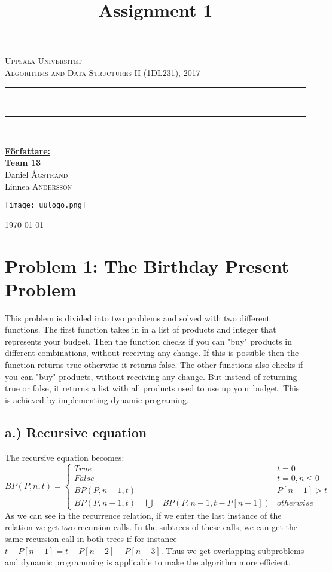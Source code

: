 \documentclass{article}
\newcommand{\HRule}{\rule{\linewidth}{0.5mm}}
\begin{document}
\begin{titlepage}
\vspace*{\fill}
\begin{center}
\textsc{\LARGE Uppsala Universitet}\\[0.3cm]
\textsc{\large Algorithms and Data Structures II (1DL231), 2017}\\[0.2cm]
\textcolor{UUred}{\HRule} \\[0.5cm]
{ \Huge \bfseries \title*{Assignment 1}}
\textcolor{UUred}{\HRule} \\[0.5cm]
\begin{flushright}
\textbf{\underline{Författare:}}\\
\textbf{Team 13}\\
Daniel \textsc{Ågstrand}\\
Linnea \textsc{Andersson}\\
\end{flushright}
\centerline{\texttt{[image: uulogo.png]}}
\textsc{{\large \today}}
\end{center}
\vspace*{\fill}
\end{titlepage}
\newpage

\section*{Problem 1: The Birthday Present Problem}
This problem is divided into two problems and solved with two different functions. The first function takes in in a list of products and integer that represents your budget. Then the function checks if you can "buy" products in different combinations, without receiving any change. If this is possible then the function returns true otherwise it returns false. The other functions also checks if you can "buy" products, without receiving any change. But instead of returning true or false, it returns a list with all products used to use up your budget. This is achieved by implementing dynamic programing. 
\subsection*{a.) Recursive equation}
The recursive equation becomes: \\
\begin{equation*}
BP(P,n,t) =
\begin{cases}
True &t = 0\\
False &t = 0, n \leq 0\\
BP(P,n-1,t) &P[n-1]>t\\
BP(P,n-1,t) \quad\bigcup\quad BP(P,n-1,t-P[n-1]) &otherwise
\end{cases}
\end{equation*}
As we can see in the recurrence relation, if we enter the last instance of the relation we get two recursion calls. In the subtrees of these calls, we can get the same recursion call in both trees if for instance $t-P[n-1] = t - P[n-2] - P[n-3]$. Thus we get overlapping subproblems and dynamic programming is applicable to make the algorithm more efficient.
\newpage
\end{document}
